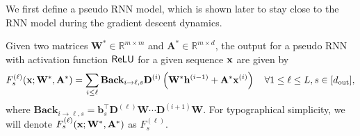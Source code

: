 We first define a pseudo RNN model, which is shown later to stay close to the RNN model during the gradient descent dynamics. 

\begin{definition}
	Given two matrices $\mathbf{W}^{\ast} \in \mathbb{R}^{m \times m}$ and $\mathbf{A}^{\ast} \in \mathbb{R}^{m \times d}$, the output for a pseudo RNN with activation function $\mathsf{ReLU}$ for a given sequence $\mathbf{x}$ are given by
	\begin{equation*}
		F_s^{(\ell)}(\mathbf{x}; \mathbf{W}^{\ast}, \mathbf{A}^{\ast})   =  \sum_{i \le \ell} \mathbf{Back}_{i \to \ell, s} \mathbf{D}^{(i)} \left(\mathbf{W}^{\ast} \mathbf{h}^{(i-1)} + \mathbf{A}^{\ast} \mathbf{x}^{(i)}\right) \quad \forall 1 \le \ell \le L,  s \in [d_{\mathrm{out}} ],
	\end{equation*}
	where $\mathbf{Back}_{i \to \ell, s} = \mathbf{b}_s^{\top} \mathbf{D}^{(\ell)} \mathbf{W} \cdots \mathbf{D}^{(i+1)} \mathbf{W}$. For typographical simplicity, we will denote $F_s^{(\ell)}(\mathbf{x}; \mathbf{W}^{\ast}, \mathbf{A}^{\ast})$ as $F_s^{(\ell)}$.
\end{definition}


